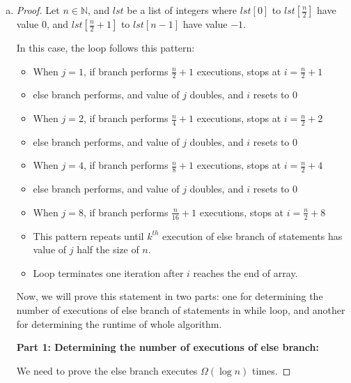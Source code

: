 \documentclass[12pt]{article}
\begin{document}
\begin{enumerate}[a.]
    \item

    \begin{proof}
        Let $n \in \mathbb{N}$, and $lst$ be a list of integers where $lst[0]$ to
        $lst[\frac{n}{2}]$ have value $0$, and $lst[\frac{n}{2}+1]$ to
        $lst[n-1]$ have value $-1$.

        \bigskip

        In this case, the loop follows this pattern:

        \begin{itemize}
            \item When $j = 1$, if branch performs $\frac{n}{2} + 1$ executions, stops at $i = \frac{n}{2} + 1$
            \item else branch performs, and value of $j$ doubles, and $i$ resets to 0
            \item When $j = 2$, if branch performs $\frac{n}{4} + 1$ executions, stops at $i = \frac{n}{2} + 2$
            \item else branch performs, and value of $j$ doubles, and $i$ resets to 0
            \item When $j = 4$, if branch performs $\frac{n}{8} + 1$ executions, stops at $i = \frac{n}{2} + 4$
            \item else branch performs, and value of $j$ doubles, and $i$ resets to 0
            \item When $j = 8$, if branch performs $\frac{n}{16} + 1$ executions, stops at $i = \frac{n}{2} + 8$
            \item This pattern repeats until $k^{th}$ execution of else branch of statements has value of $j$ half the size of $n$.
            \item Loop terminates one iteration after $i$ reaches the end of array.
        \end{itemize}

        \bigskip

        Now, we will prove this statement in two parts: one for determining the
        number of executions of else branch of statements in while loop, and another for
        determining the runtime of whole algorithm.

        \bigskip

        \textbf{Part 1: Determining the number of executions of else branch:}

        \bigskip

        We need to prove the else branch executes $\Omega(\log n)$ times.


\end{proof}
\end{enumerate}
\end{document}
